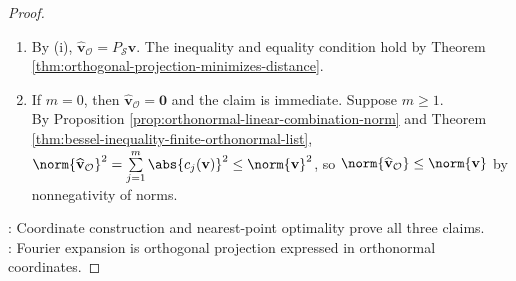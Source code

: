 \begin{theorem}
\begin{proof}
\begin{enumerate}[label=(\roman*)]
If $\mathbf{s}\in\mathcal{S}$ also satisfies $\mathbf{v}-\mathbf{s}\in\mathcal{S}^{\perp}$, then $\mathbf{s}-\widehat{\mathbf{v}}_{\mathcal{O}}=(\mathbf{v}-\widehat{\mathbf{v}}_{\mathcal{O}})-(\mathbf{v}-\mathbf{s})\in\mathcal{S}\cap\mathcal{S}^{\perp}$, so $\mathbf{s}=\widehat{\mathbf{v}}_{\mathcal{O}}$ by Proposition \ref{prop:basic-properties-orthogonal-complement}(iv).
\item By (i), $\widehat{\mathbf{v}}_{\mathcal{O}}=P_{\mathcal{S}}\mathbf{v}$. The inequality and equality condition hold by Theorem \ref{thm:orthogonal-projection-minimizes-distance}.
\item If $m=0$, then $\widehat{\mathbf{v}}_{\mathcal{O}}=\mathbf{0}$ and the claim is immediate. Suppose $m\geq1$.\\
By Proposition \ref{prop:orthonormal-linear-combination-norm} and Theorem \ref{thm:bessel-inequality-finite-orthonormal-list}, $\norm{\widehat{\mathbf{v}}_{\mathcal{O}}}^2=\sum\limits_{j=1}^{m}\abs{c_j(\mathbf{v})}^2\leq\norm{\mathbf{v}}^2$, so $\norm{\widehat{\mathbf{v}}_{\mathcal{O}}}\leq\norm{\mathbf{v}}$ by nonnegativity of norms.
\end{enumerate}
: Coordinate construction and nearest-point optimality prove all three claims.\\
: Fourier expansion is orthogonal projection expressed in orthonormal coordinates.
\end{proof}
\end{theorem}

